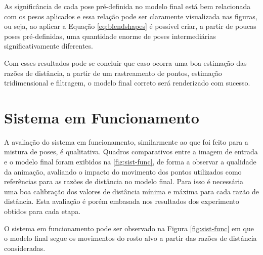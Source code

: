 As significância de cada pose pré-definida no modelo final está bem relacionada com os pesos aplicados e essa relação pode ser claramente visualizada nas figuras, ou seja, ao aplicar a Equação \ref{eq:blendshapes} é possível criar, a partir de poucas poses pré-definidas, uma quantidade enorme de poses intermediárias significativamente diferentes.

Com esses resultados pode se concluir que caso ocorra uma boa estimação das razões de distância, a partir de um rastreamento de pontos, estimação tridimensional e filtragem, o modelo final correto será renderizado com sucesso.

\section{Sistema em Funcionamento}

A avaliação do sistema em funcionamento, similarmente ao que foi feito para a mistura de poses, é qualitativa. Quadros comparativos entre a imagem de entrada e o modelo final foram exibidos na \ref{fig:sist-func}, de forma a observar a qualidade da animação, avaliando o impacto do movimento dos pontos utilizados como referências para as razões de distância no modelo final. Para isso é necessária uma boa calibração dos valores de distância mínima e máxima para cada razão de distância. Esta avaliação é porém embasada nos resultados dos experimento obtidos para cada etapa.

O sistema em funcionamento pode ser observado na Figura \ref{fig:sist-func} em que o modelo final segue os movimentos do rosto alvo a partir das razões de distância consideradas.

